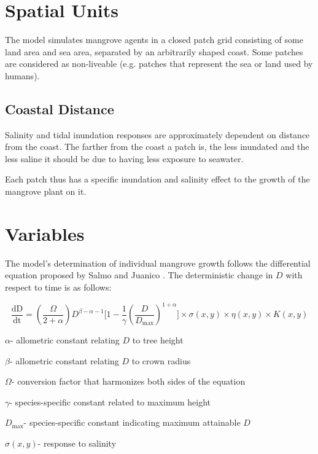 \section{Spatial Units}

The model simulates mangrove agents in a closed patch grid consisting of
some land area and sea area, separated by an arbitrarily shaped coast. Some patches
are considered as non-liveable (e.g. patches that represent the sea or land used by humans).

\subsection{Coastal Distance}

Salinity and tidal inundation responses are approximately dependent on
distance from the coast. The farther from the coast a patch is, the less
inundated and the less saline it should be due to having less exposure
to seawater.

Each patch thus has a specific inundation and salinity effect to the
growth of the mangrove plant on it.

\section{Variables}

The model's determination of individual mangrove growth follows the
differential equation proposed by Salmo and Juanico \cite{SalmoJuanico2015}. The
deterministic change in $D$ with respect to time is as follows:


\begin{dmath}
\frac{\text{dD}}{\text{dt}} = (\frac{\Omega}{2 + \alpha})D^{\beta - \alpha - 1}\lbrack 1 - \frac{1}{\gamma}{(\frac{D}{D_{\max}})}^{1 + \alpha}\rbrack \times \sigma(x,y) \times \eta(x,y) \times K(x,y)
\end{dmath}


\(\alpha\)- allometric constant relating $D$ to tree height

\(\beta\)- allometric constant relating $D$ to crown radius

\(\Omega\)- conversion factor that harmonizes both sides of the equation

\(\gamma\)- species-specific constant related to maximum height

\(D_{\max}\)- species-specific constant indicating maximum attainable $D$

\(\sigma(x,y)\)- response to salinity

